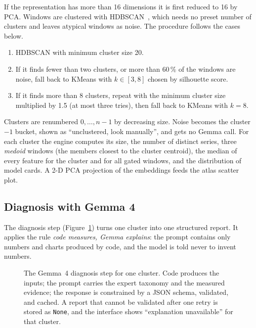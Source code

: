 \documentclass[10pt,twocolumn,a4paper]{article}
\begin{document}
If the representation has more than 16 dimensions it is first reduced to 16 by PCA. Windows are clustered with HDBSCAN~\cite{campello2013}, which needs no preset number of clusters and leaves atypical windows as noise. The procedure follows the cases below.
\begin{enumerate}[label=(\roman*)]
  \item HDBSCAN with minimum cluster size 20.
  \item If it finds fewer than two clusters, or more than 60\,\% of the windows are noise, fall back to KMeans with $k\in[3,8]$ chosen by silhouette score.
  \item If it finds more than 8 clusters, repeat with the minimum cluster size multiplied by 1.5 (at most three tries), then fall back to KMeans with $k=8$.
\end{enumerate}
Clusters are renumbered $0,\dots,n-1$ by decreasing size. Noise becomes the cluster $-1$ bucket, shown as ``unclustered, look manually'', and gets no Gemma call. For each cluster the engine computes its size, the number of distinct series, three \emph{medoid} windows (the members closest to the cluster centroid), the median of every feature for the cluster and for all gated windows, and the distribution of model cards. A 2-D PCA projection of the embeddings feeds the atlas scatter plot.

\subsection{Diagnosis with Gemma 4}
\label{sec:gemma}

The diagnosis step (Figure~\ref{fig:gemma}) turns one cluster into one structured report. It applies the rule \emph{code measures, Gemma explains}: the prompt contains only numbers and charts produced by code, and the model is told never to invent numbers.

\begin{figure}[t]
  \centering
  
  \caption{The Gemma~4 diagnosis step for one cluster. Code produces the inputs; the prompt carries the expert taxonomy and the measured evidence; the response is constrained by a JSON schema, validated, and cached. A report that cannot be validated after one retry is stored as \texttt{None}, and the interface shows ``explanation unavailable'' for that cluster.}
  \label{fig:gemma}
\end{figure}
\end{document}

